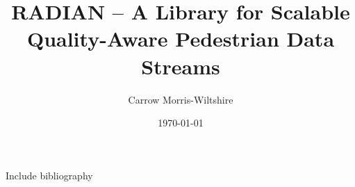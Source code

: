 \documentclass[a4paper,11pt]{article}
\title{RADIAN – A Library for Scalable Quality-Aware Pedestrian Data Streams}
\author{Carrow Morris-Wiltshire}
\date{\today}
\begin{document}
\label{sec:abstract}


\label{sec:acronyms}


% 

% 

% 

\label{sec:methodology}


\label{sec:results}


\label{sec:discussion}


% 

Include bibliography
\newpage
\label{sec:bibliography}


% 
\end{document}
